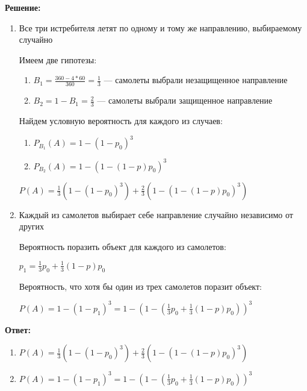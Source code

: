 \documentclass{article}
\begin{document}
\textbf{Решение:}

\begin{enumerate}
    \item Все три истребителя летят по одному и тому же направлению, выбираемому случайно
    
    Имеем две гипотезы:

    \begin{enumerate}
        \item $B_1 = \frac{360 - 4 * 60}{360} = \frac{1}{3} $ — самолеты выбрали незащищенное направление
        \item $B_2 = 1 - B_1 = \frac{2}{3}$ — самолеты выбрали защищенное направление
    \end{enumerate}

    Найдем условную вероятность для каждого из случаев:

    \begin{enumerate}
        \item $P_{B_1}(A) = 1 - (1 - p_0)^3$
        \item $P_{B_2}(A) = 1 - (1 - (1 - p) p_0)^3$
    \end{enumerate}

    $P(A) = \frac{1}{3} (1 - (1 - p_0)^3) + \frac{2}{3} (1 - (1 - (1 - p) p_0)^3)$
    \item Каждый из самолетов выбирает себе направление случайно независимо от других

    Вероятность поразить объект для каждого из самолетов:

    $p_1 = \frac{1}{3} p_0 + \frac{1}{3} (1 - p) p_0$

    Вероятность, что хотя бы один из трех самолетов поразит объект:

    $P(A) = 1 - (1 - p_1)^3 = 1 - (1 - (\frac{1}{3} p_0 + \frac{1}{3} (1 - p) p_0))^3$
\end{enumerate}

\textbf{Ответ:}

\begin{enumerate}
    \item $P(A) = \frac{1}{3} (1 - (1 - p_0)^3) + \frac{2}{3} (1 - (1 - (1 - p) p_0)^3)$
    \item $P(A) = 1 - (1 - p_1)^3 = 1 - (1 - (\frac{1}{3} p_0 + \frac{1}{3} (1 - p) p_0))^3$
\end{enumerate}
\end{document}
